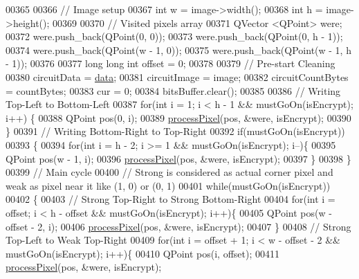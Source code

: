 \begin{DoxyCode}
00365 
00366     \textcolor{comment}{// Image setup}
00367     \textcolor{keywordtype}{int} w = image->width();
00368     \textcolor{keywordtype}{int} h = image->height();
00369 
00370     \textcolor{comment}{// Visited pixels array}
00371     QVector <QPoint> were;
00372     were.push\_back(QPoint(0, 0));
00373     were.push\_back(QPoint(0, h - 1));
00374     were.push\_back(QPoint(w - 1, 0));
00375     were.push\_back(QPoint(w - 1, h - 1));
00376 
00377     \textcolor{keywordtype}{long} \textcolor{keywordtype}{long} \textcolor{keywordtype}{int} offset = 0;
00378 
00379     \textcolor{comment}{// Pre-start Cleaning}
00380     circuitData = \hyperlink{namespace_errors_dict_setup_af570460846fb9f0c91abd308a095dcdc}{data};
00381     circuitImage = image;
00382     circuitCountBytes = countBytes;
00383     cur = 0;
00384     bitsBuffer.clear();
00385 
00386     \textcolor{comment}{// Writing Top-Left to Bottom-Left}
00387     \textcolor{keywordflow}{for}(\textcolor{keywordtype}{int} i = 1; i < h - 1 && mustGoOn(isEncrypt); i++) \{
00388         QPoint pos(0, i);
00389         \hyperlink{class_model_p_c_a1171f9fe1550133dc9053a46b4e5bcfd}{processPixel}(pos, &were, isEncrypt);
00390     \}
00391     \textcolor{comment}{// Writing Bottom-Right to Top-Right}
00392     \textcolor{keywordflow}{if}(mustGoOn(isEncrypt))
00393     \{
00394         \textcolor{keywordflow}{for}(\textcolor{keywordtype}{int} i = h - 2; i >= 1 && mustGoOn(isEncrypt); i--)\{
00395             QPoint pos(w - 1, i);
00396             \hyperlink{class_model_p_c_a1171f9fe1550133dc9053a46b4e5bcfd}{processPixel}(pos, &were, isEncrypt);
00397         \}
00398     \}
00399     \textcolor{comment}{// Main cycle}
00400     \textcolor{comment}{// Strong is considered as actual corner pixel and weak as pixel near it like (1, 0) or (0, 1)}
00401     \textcolor{keywordflow}{while}(mustGoOn(isEncrypt))
00402     \{
00403         \textcolor{comment}{// Strong Top-Right to Strong Bottom-Right}
00404         \textcolor{keywordflow}{for}(\textcolor{keywordtype}{int} i = offset; i < h - offset && mustGoOn(isEncrypt); i++)\{
00405             QPoint pos(w - offset - 2, i);
00406             \hyperlink{class_model_p_c_a1171f9fe1550133dc9053a46b4e5bcfd}{processPixel}(pos, &were, isEncrypt);
00407         \}
00408         \textcolor{comment}{// Strong Top-Left to Weak Top-Right}
00409         \textcolor{keywordflow}{for}(\textcolor{keywordtype}{int} i = offset + 1; i < w - offset - 2 && mustGoOn(isEncrypt); i++)\{
00410             QPoint pos(i, offset);
00411             \hyperlink{class_model_p_c_a1171f9fe1550133dc9053a46b4e5bcfd}{processPixel}(pos, &were, isEncrypt);

\end{DoxyCode}
